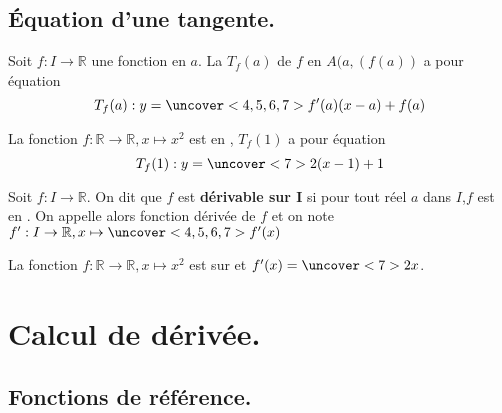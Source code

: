 \documentclass{beamer}
\newcommand{\R}{\mathbb{R}}
\begin{document}
  \subsection{\'Equation d'une tangente.}
  
  \begin{frame}
       
   \begin{theorem}
      Soit $f:I \to \R$ une fonction  en $a$. 
      La  $T_f(a)$ de $f$ en $A(a,(f(a))$ a
      pour équation $$T_f(a):y=\uncover<4,5,6,7>{f'(a)(x-a)+f(a)}$$
   \end{theorem}
   
    \begin{example}
  
  La fonction $f:\R \to \R, x \mapsto x^2$ est 
   en ,
  $T_f(1)$ a pour équation
  $$T_f(1):y=\uncover<7>{2(x-1)+1}$$
  
   \end{example}
  \end{frame}
  
  \begin{frame}
   \begin{definition} 
    
   Soit $f:I \to \R$. On dit que $f$ est \textbf{dérivable sur 
   $\mathbf{I}$} si pour tout réel $a$ dans $I$,$f$ est 
   en . On appelle alors fonction dérivée de $f$ et on note 
   $f':I \to \R, x \mapsto \uncover<4,5,6,7>{f'(x)}$ 
   \end{definition}
   
   \begin{example}
    
  La fonction $f:\R \to \R, x \mapsto x^2$ est  sur 
  \uncover<6,7>{$\R$} et $f'(x)=\uncover<7>{2 x}$.  
    
   \end{example}
  \end{frame}
  
   \section{Calcul de dérivée.}
   
    \subsection{Fonctions de référence.}
    
\end{document}
